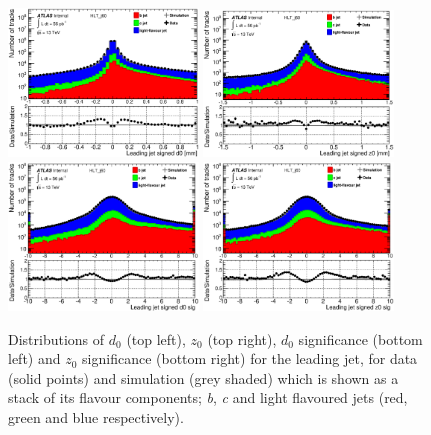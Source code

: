 \documentclass[12pt, onecolumn,notitlepage]{article}
\begin{document}
\begin{figure}[!htb]
	 \includegraphics[width=0.45\textwidth]{plots/LeadingJet/trk_ip3d_d0.eps}
	 \includegraphics[width=0.45\textwidth]{plots/LeadingJet/trk_ip3d_z0.eps}\\
         \includegraphics[width=0.45\textwidth]{plots/LeadingJet/trk_ip3d_d0sig.eps}
         \includegraphics[width=0.45\textwidth]{plots/LeadingJet/trk_ip3d_z0sig.eps}
	 \caption{Distributions of $d_0$ (top left), $z_0$ (top right), $d_0$ significance (bottom left) and $z_0$ significance (bottom right) 
           for the leading jet, for data (solid points) and simulation (grey shaded) 
           which is shown as a stack of its flavour components; \textit{b}, \textit{c} and light flavoured jets (red, green and blue respectively).}
         \label{IP}
\end{figure}
\end{document}
